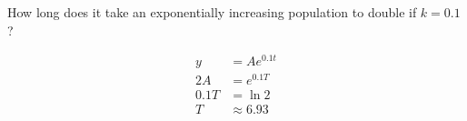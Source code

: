 How long does it take an exponentially increasing population to double if $k = 0.1$?

\begin{solution}
    \begin{align*}
        y &= Ae^{0.1t} \\
        2A &= e^{0.1T} \\
        0.1T &= \ln{2} \\
        T &\approx 6.93
    \end{align*}
\end{solution}